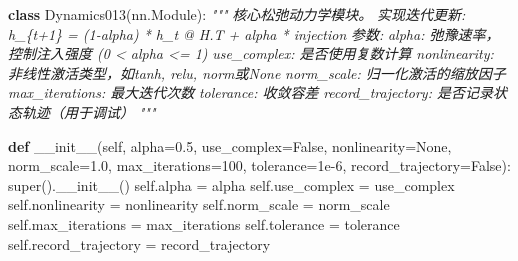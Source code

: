 \documentclass[
  12pt,
]{article}
\newenvironment{Shaded}{}{}
\newcommand{\BuiltInTok}[1]{#1}
\newcommand{\CommentTok}[1]{\textcolor[rgb]{0.38,0.63,0.69}{\textit{#1}}}
\newcommand{\DecValTok}[1]{\textcolor[rgb]{0.25,0.63,0.44}{#1}}
\newcommand{\FloatTok}[1]{\textcolor[rgb]{0.25,0.63,0.44}{#1}}
\newcommand{\FunctionTok}[1]{\textcolor[rgb]{0.02,0.16,0.49}{#1}}
\newcommand{\KeywordTok}[1]{\textcolor[rgb]{0.00,0.44,0.13}{\textbf{#1}}}
\newcommand{\NormalTok}[1]{#1}
\newcommand{\OperatorTok}[1]{\textcolor[rgb]{0.40,0.40,0.40}{#1}}
\newcommand{\VariableTok}[1]{\textcolor[rgb]{0.10,0.09,0.49}{#1}}
\begin{document}
\begin{Shaded}
\begin{Highlighting}[]
\KeywordTok{class}\NormalTok{ Dynamics013(nn.Module):}
    \CommentTok{"""}
\CommentTok{    核心松弛动力学模块。}
\CommentTok{    实现迭代更新: h\_\{t+1\} = (1{-}alpha) * h\_t @ H.T + alpha * injection}
\CommentTok{    }
\CommentTok{    参数:}
\CommentTok{        alpha: 弛豫速率，控制注入强度 (0 \textless{} alpha \textless{}= 1)}
\CommentTok{        use\_complex: 是否使用复数计算}
\CommentTok{        nonlinearity: 非线性激活类型，如\textquotesingle{}tanh\textquotesingle{}, \textquotesingle{}relu\textquotesingle{}, \textquotesingle{}norm\textquotesingle{}或None}
\CommentTok{        norm\_scale: 归一化激活的缩放因子}
\CommentTok{        max\_iterations: 最大迭代次数}
\CommentTok{        tolerance: 收敛容差}
\CommentTok{        record\_trajectory: 是否记录状态轨迹（用于调试）}
\CommentTok{    """}
    
    \KeywordTok{def} \FunctionTok{\_\_init\_\_}\NormalTok{(}\VariableTok{self}\NormalTok{, alpha}\OperatorTok{=}\FloatTok{0.5}\NormalTok{, use\_complex}\OperatorTok{=}\VariableTok{False}\NormalTok{, }
\NormalTok{                 nonlinearity}\OperatorTok{=}\VariableTok{None}\NormalTok{, norm\_scale}\OperatorTok{=}\FloatTok{1.0}\NormalTok{,}
\NormalTok{                 max\_iterations}\OperatorTok{=}\DecValTok{100}\NormalTok{, tolerance}\OperatorTok{=}\FloatTok{1e{-}6}\NormalTok{,}
\NormalTok{                 record\_trajectory}\OperatorTok{=}\VariableTok{False}\NormalTok{):}
        \BuiltInTok{super}\NormalTok{().}\FunctionTok{\_\_init\_\_}\NormalTok{()}
        \VariableTok{self}\NormalTok{.alpha }\OperatorTok{=}\NormalTok{ alpha}
        \VariableTok{self}\NormalTok{.use\_complex }\OperatorTok{=}\NormalTok{ use\_complex}
        \VariableTok{self}\NormalTok{.nonlinearity }\OperatorTok{=}\NormalTok{ nonlinearity}
        \VariableTok{self}\NormalTok{.norm\_scale }\OperatorTok{=}\NormalTok{ norm\_scale}
        \VariableTok{self}\NormalTok{.max\_iterations }\OperatorTok{=}\NormalTok{ max\_iterations}
        \VariableTok{self}\NormalTok{.tolerance }\OperatorTok{=}\NormalTok{ tolerance}
        \VariableTok{self}\NormalTok{.record\_trajectory }\OperatorTok{=}\NormalTok{ record\_trajectory}
        

\end{Highlighting}
\end{Shaded}
\end{document}
